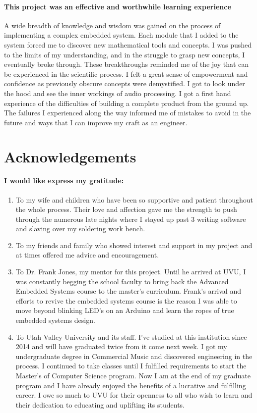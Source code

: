 \documentclass[acmlarge,screen]{acmart}
\begin{document}
	\paragraph{This project was an effective and worthwhile learning experience} A wide breadth of knowledge and wisdom was gained on the process of implementing a complex embedded system. Each module that I added to the system forced me to discover new mathematical tools and concepts. I was pushed to the limits of my understanding, and in the struggle to grasp new concepts, I eventually broke through. These breakthroughs reminded me of the joy that can be experienced in the scientific process. I felt a great sense of empowerment and confidence as previously obscure concepts were demystified. I got to look under the hood and see the inner workings of audio processing. I got a first hand experience of the difficulties of building a complete product from the ground up. The failures I experienced along the way informed me of mistakes to avoid in the future and ways that I can improve my craft as an engineer.

\section{Acknowledgements}
	\paragraph{I would like express my gratitude:}
	\begin{enumerate}
		\item To my wife and children who have been so supportive and patient throughout the whole process. Their love and affection gave me the strength to push through the numerous late nights where I stayed up past 3 writing software and slaving over my soldering work bench.
		\item To my friends and family who showed interest and support in my project and at times offered me advice and encouragement.
		\item To Dr. Frank Jones, my mentor for this project. Until he arrived at UVU, I was constantly begging the school faculty to bring back the Advanced Embedded Systems course to the master's curriculum. Frank's arrival and efforts to revive the embedded systems course is the reason I was able to move beyond blinking LED's on an Arduino and learn the ropes of true embedded systems design.
		\item To Utah Valley University and its staff. I've studied at this institution since 2014 and will have graduated twice from it come next week. I got my undergraduate degree in Commercial Music and discovered engineering in the process. I continued to take classes until I fulfilled requirements to start the Master's of Computer Science program. Now I am at the end of my graduate program and I have already enjoyed the benefits of a lucrative and fulfilling career. I owe so much to UVU for their openness to all who wish to learn and their dedication to educating and uplifting its students.
	\end{enumerate}
\end{document}
